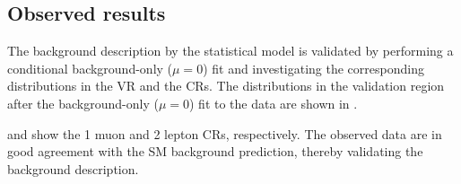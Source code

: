 \subsection{Observed results}
\label{sec:monoV:results:observed}

The background description by the statistical model is validated by performing a conditional background-only (\(\mu = 0\)) fit and investigating the corresponding distributions in the VR and the CRs. The \met distributions in the validation region after the background-only (\(\mu = 0\)) fit to the data are shown in .

 and  show the 1 muon and 2 lepton CRs, respectively. The observed data are in good agreement with the SM background prediction, thereby validating the background description.

